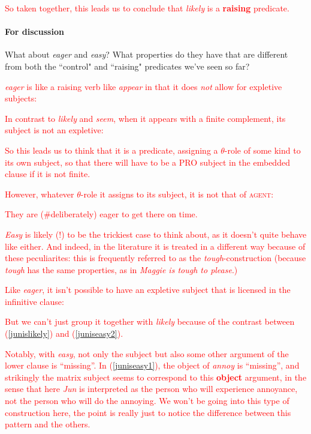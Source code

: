 \documentclass{article}
\begin{document}
\textcolor{red}{So taken together, this leads us to conclude that \emph{likely} is a \textbf{raising} predicate.}

\paragraph{For discussion} What about \emph{eager} and \emph{easy}? What properties do they have that are different from both the ``control" and ``raising" predicates we've seen so far?

\textcolor{red}{\emph{eager} is like a raising verb like \emph{appear} in that it does \emph{not} allow for expletive subjects:
\begin{exe}
\end{exe}
In contrast to \emph{likely} and \emph{seem}, when it appears with a finite complement, its subject is not an expletive:
\begin{exe}
\end{exe} 
So this leads us to think that it is a  predicate, assigning a $\theta$-role of some kind to its own subject, so that there will have to be a PRO subject in the embedded clause if it is not finite.}

\textcolor{red}{However, whatever $\theta$-role it assigns to its subject, it is not that of \textsc{agent}:
\begin{exe}
    \sn They are (\#deliberately) eager to get there on time.
\end{exe}}

\textcolor{red}{\emph{Easy} is likely (!) to be the trickiest case to think about, as it doesn't quite behave like either.
And indeed, in the literature it is treated in a different way because of these peculiarites:  this is frequently referred to as the \emph{tough}-construction (because \emph{tough} has the same properties, as in \emph{Maggie is tough to please}.) }

\textcolor{red}{Like \emph{eager}, it isn't possible to have an expletive subject that is licensed in the infinitive clause:
\begin{exe}
\end{exe}
But we can't just group it together with \emph{likely} because of the contrast between (\ref{junislikely}) and (\ref{juniseasy2}).}

\textcolor{red}{Notably, with \emph{easy}, not only the subject but also some other argument of the lower clause is ``missing''.  In (\ref{juniseasy1}), the object of \emph{annoy} is ``missing'', and strikingly the matrix subject seems to correspond to this \textbf{object} argument, in the sense that here \emph{Jun} is interpreted as the person who will experience annoyance, not the person who will do the annoying.
We won't be going into this type of construction here, the point is really just to notice the difference between this pattern and the others.}
\end{document}
